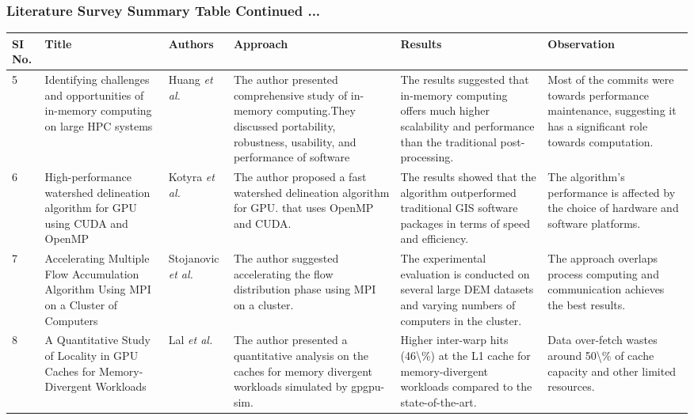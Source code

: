 \documentclass[]{beamer}
\begin{document}
	

		\begin{frame}
		\frametitle{Literature Survey Summary Table Continued ...}
		
		\begin{table}[]
			\tiny
			\begin{tabular}{| p{0.1cm} | p{1.6cm} | p{0.5cm} | p{2cm} | p{2.3cm} |  p{2.3cm} | }
				
				\hline
				\textbf{SI No.} &  \textbf{Title} & \textbf{Authors} & \textbf{Approach} & \textbf{Results} & \textbf{Observation}\\
				\hline
			
				5     & Identifying challenges and opportunities of in-memory computing on large HPC systems &  Huang \textit{et al.} \cite{HUANG2022106} & The author presented comprehensive study of in-memory computing.\newline{}They discussed portability, robustness, usability, and performance of software & The results suggested that in-memory computing offers much higher scalability and performance than the \newline{}traditional post-processing. & Most of the commits were towards performance maintenance, suggesting it has a significant role towards computation. \\
				\hline
				6     & High-performance watershed delineation algorithm for GPU using CUDA and OpenMP & Kotyra \textit{et al.} \cite{KOTYRA2023105613}& The author proposed a fast watershed delineation algorithm for GPU. that uses OpenMP and CUDA. &  The results showed that the algorithm outperformed traditional GIS software packages in terms of speed and efficiency.  & The algorithm's performance is affected by the choice of hardware and software platforms.  \\
				\hline
				7     & Accelerating Multiple Flow Accumulation Algorithm Using MPI on a Cluster of Computers &  Stojanovic \textit{et al.} \cite{stojanovic2020accelerating} & The author suggested accelerating the flow distribution phase using MPI on a cluster. &  The experimental evaluation is conducted on several large DEM datasets and varying numbers of computers in the cluster. & The approach  overlaps process computing and communication achieves the best results. \\
				\hline
				8     & A Quantitative Study of Locality in GPU Caches for Memory-Divergent Workloads & Lal \textit{et al.} \cite{10.1007/978-3-030-60939-9_16}& The author  presented a quantitative analysis on the caches for memory divergent workloads simulated by gpgpu-sim. & Higher inter-warp hits (46\textbackslash{}\%) at the L1 cache for memory-divergent workloads compared to the state-of-the-art. & Data over-fetch wastes around 50\textbackslash{}\% of cache capacity and other limited resources. \\
				\hline
			\end{tabular}
		\end{table}
	\end{frame}
\end{document}
